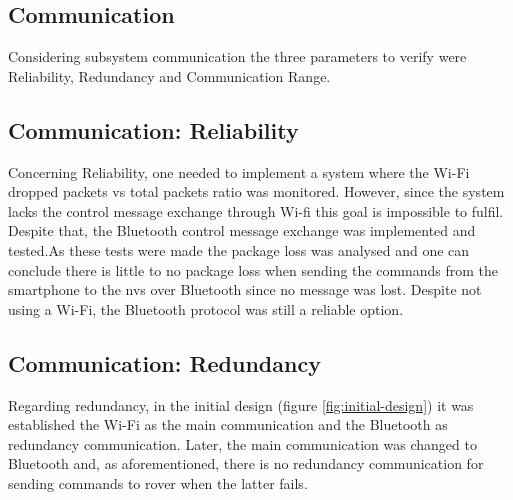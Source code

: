 \subsection{Communication}
\label{communication}
Considering subsystem communication the three parameters to verify were Reliability, Redundancy and Communication Range.
\subsection{Communication: Reliability}
\label{communication}
Concerning Reliability, one needed to implement a system where the Wi-Fi dropped packets vs total packets ratio was monitored. However, since the system lacks the control message exchange through Wi-fi this goal is impossible to fulfil. Despite that, the Bluetooth control message exchange was implemented and tested.As these tests were made the package loss was analysed and one can conclude there is little to no package loss when sending the commands from the smartphone to the \gls{nvs} over Bluetooth since no message was lost. Despite not using a Wi-Fi, the Bluetooth protocol was still a reliable option.
%
\subsection{Communication: Redundancy}
\label{communication}
Regarding redundancy, in the initial design (figure \ref{fig:initial-design}) it was established the Wi-Fi as the main communication and the Bluetooth as redundancy communication. Later, the main communication was changed to Bluetooth and, as aforementioned, there is no redundancy communication for sending commands to rover when the latter fails.
%